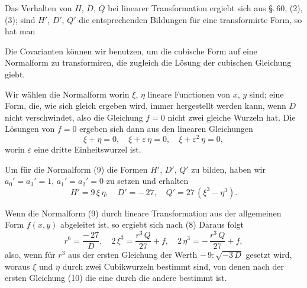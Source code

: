 Das Verhalten von $H$, $D$, $Q$ bei linearer Transformation ergiebt sich aus \S.\,60, (2), (3); sind $H'$, $D'$, $Q'$ die entsprechenden Bildungen für eine transformirte Form, so hat man

Die Covarianten können wir benutzen, um die cubische Form auf eine Normalform zu transformiren, die zugleich die Lösung der cubischen Gleichung giebt.

Wir wählen die Normalform
worin $\xi$, $\eta$ lineare Functionen von $x$, $y$ sind; eine Form, die, wie sich gleich ergeben wird, immer hergestellt werden kann, wenn $D$ nicht verschwindet, also die Gleichung $f = 0$ nicht zwei gleiche Wurzeln hat. Die Lösungen von $f = 0$ ergeben sich dann aus den linearen Gleichungen
\[
\xi + \eta = 0,\quad \xi + \varepsilon\,\eta = 0,\quad \xi + \varepsilon^2\,\eta = 0,
\]
worin $\varepsilon$ eine dritte Einheitswurzel ist.

Um für die Normalform (9) die Formen $H'$, $D'$, $Q'$ zu bilden, haben wir $a_0' = a_3' = 1$, $a_1' = a_2' = 0$ zu setzen und erhalten
\[
H' = 9\,\xi\,\eta,\quad D' = -\,27,\quad Q' = 27\,(\xi^3 - \eta^3).
\]

Wenn die Normalform (9) durch lineare Transformation aus der allgemeinen Form $f(x,y)$ abgeleitet ist, so ergiebt sich nach (8)
Daraus folgt
\[
r^6 = \frac{-\,27}{D},\quad 2\,\xi^3 = \frac{r^3\,Q}{27} + f,\quad 2\,\eta^3 = -\,\frac{r^3\,Q}{27} + f,
\]
also, wenn für $r^3$ aus der ersten Gleichung der Werth $-\,9 : \sqrt{-3\,D}$ gesetzt wird,
woraus $\xi$ und $\eta$ durch zwei Cubikwurzeln bestimmt sind, von denen nach der ersten Gleichung (10) die eine durch die andere bestimmt ist.

